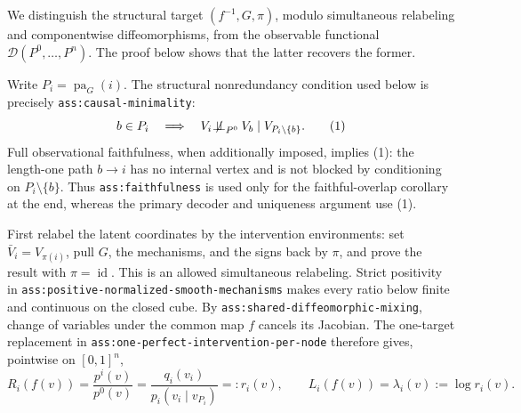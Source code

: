 We distinguish the structural target \((f^{-1},G,\pi)\), modulo simultaneous relabeling and componentwise diffeomorphisms, from the observable functional \(\mathscr D(P^0,\ldots,P^n)\).  The proof below shows that the latter recovers the former.

Write \(P_i=\operatorname{pa}_G(i)\).  The structural nonredundancy condition used below is precisely \texttt{ass:causal-minimality}:
\[
 b\in P_i\quad\Longrightarrow\quad
 V_i\mathbin{\not\!\perp\!\!\!\perp}_{P^0}V_b
 \mid V_{P_i\setminus\{b\}}.
\tag{1}
\]
Full observational faithfulness, when additionally imposed, implies (1): the length-one path \(b\to i\) has no internal vertex and is not blocked by conditioning on \(P_i\setminus\{b\}\).  Thus \texttt{ass:faithfulness} is used only for the faithful-overlap corollary at the end, whereas the primary decoder and uniqueness argument use (1).

First relabel the latent coordinates by the intervention environments: set \(\bar V_i=V_{\pi(i)}\), pull \(G\), the mechanisms, and the signs back by \(\pi\), and prove the result with \(\pi=\operatorname{id}\).  This is an allowed simultaneous relabeling.  Strict positivity in \texttt{ass:positive-normalized-smooth-mechanisms} makes every ratio below finite and continuous on the closed cube.  By \texttt{ass:shared-diffeomorphic-mixing}, change of variables under the common map \(f\) cancels its Jacobian.  The one-target replacement in \texttt{ass:one-perfect-intervention-per-node} therefore gives, pointwise on \([0,1]^n\),
\[
 R_i(f(v))=\frac{p^i(v)}{p^0(v)}
 =\frac{q_i(v_i)}{p_i(v_i\mid v_{P_i})}
 =:r_i(v),
 \qquad
 L_i(f(v))=\lambda_i(v):=\log r_i(v).
\tag{2}
\]

